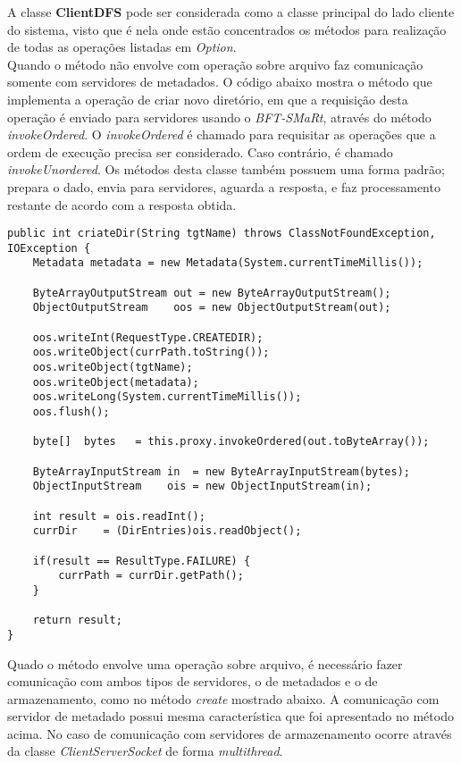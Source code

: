 A classe \textbf{ClientDFS} pode ser considerada como a classe principal do lado cliente do sistema, visto que é nela onde estão concentrados os métodos para realização de todas as operações listadas em \textit{Option}.
\\
Quando o método não envolve com operação sobre arquivo faz comunicação somente com servidores de metadados.
O código abaixo mostra o método que implementa a operação de criar novo diretório, em que a requisição desta operação é enviado para servidores usando o \textit{BFT-SMaRt}, através do método \textit{invokeOrdered}.
O \textit{invokeOrdered} é chamado para requisitar as operações que a ordem de execução precisa ser considerado. Caso contrário, é chamado  \textit{invokeUnordered}.
Os métodos desta classe também possuem uma forma padrão; prepara o dado, envia para servidores, aguarda a resposta, e faz processamento restante de acordo com a resposta obtida.  
\begin{lstlisting}[basicstyle=\ttfamily\footnotesize, frame=single]	
public int criateDir(String tgtName) throws ClassNotFoundException, IOException {
	Metadata metadata = new Metadata(System.currentTimeMillis());
	
	ByteArrayOutputStream out = new ByteArrayOutputStream();
	ObjectOutputStream    oos = new ObjectOutputStream(out);
	
	oos.writeInt(RequestType.CREATEDIR);
	oos.writeObject(currPath.toString());
	oos.writeObject(tgtName);
	oos.writeObject(metadata);
	oos.writeLong(System.currentTimeMillis());
	oos.flush();
	
	byte[]  bytes   = this.proxy.invokeOrdered(out.toByteArray());
	
	ByteArrayInputStream in  = new ByteArrayInputStream(bytes);
	ObjectInputStream    ois = new ObjectInputStream(in);
	
	int result = ois.readInt();
	currDir    = (DirEntries)ois.readObject();
	
	if(result == ResultType.FAILURE) {
		currPath = currDir.getPath();
	}
	
	return result;
}
\end{lstlisting}
Quado o método envolve uma operação sobre arquivo, é necessário fazer comunicação com ambos tipos de servidores, o de metadados e o de armazenamento, como no método \textit{create} mostrado abaixo.
A comunicação com servidor de metadado possui mesma característica que foi apresentado no método acima.
No caso de comunicação com servidores de armazenamento ocorre através da classe \textit{ClientServerSocket} de forma \textit{multithread}.
